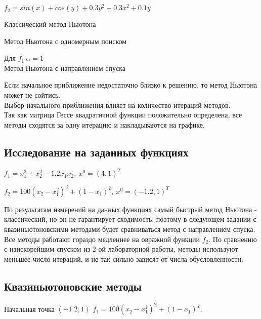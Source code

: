 \(f_2 = sin(x) + cos(y) + 0.3y^2+ 0.3x^2 + 0.1y\)

Классический метод Ньютона\\

Метод Ньютона с одномерным поиском\\

\dstable

Для $f_1\ \alpha = 1$\\

Метод Ньютона с направлением спуска\\


Если начальное приближение недостаточно близко к решению, то метод Ньютона может не сойтись.\\
Выбор начального приближения влияет на количество итераций методов.\\
Так как матрица Гессе квадратичной функции положительно определена, все методы сходятся за одну итерацию и накладываются на графике.

\subsection{Исследование на заданных функциях}
\(f_1 = x_1^2 + x_2^2 - 1.2x_1x_2,\ x^0 = (4, 1)^T\) \\

\(f_2 = 100(x_2 - x_1^2)^2 + (1 - x_1)^2,\ x^0 = (-1.2, 1)^T\)	


По результатам измерений на данных функциях самый быстрый метод Ньютона - классический, но он не гарантирует сходимость, поэтому в следующем задании с квазиньютоновскими методами будет сравниваться метод с направлением спуска.\\
 Все методы работают гораздо медленнее на овражной функции $f_2$. По сравнению с наискорейшим спуском из 2-ой лабораторной работы, методы используют меньшее число итераций, и не так сильно зависят от числа обусловленности.

\subsection{Квазиньютоновские методы}
Начальная точка $(-1.2, 1)$
\(f_1 = 100(x_2 - x_1^2)^2 + (1 - x_1)^2,\)\\

